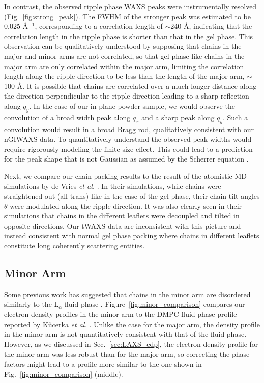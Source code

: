 In contrast, the observed ripple phase WAXS 
peaks were instrumentally 
resolved (Fig.~\ref{fig:strong_peak}). 
The FWHM of the stronger peak was estimated to be 0.025 \AA$^{-1}$,
corresponding to a correlation length of $\sim$240 \AA,
indicating that the correlation length in the ripple phase is shorter 
than that in the gel phase.
This observation can be qualitatively understood by supposing that chains in the major
and minor arms are not correlated, so that gel phase-like chains in the 
major arm are only correlated within the major arm, limiting the correlation
length along the ripple direction to be less than the length of the major 
arm, $\sim$100 \AA. 
It is possible that chains are correlated over a much longer distance 
along the direction perpendicular to the ripple direction leading to
a sharp reflection along $q_y$.
In the case of our in-plane powder sample, we would observe the convolution
of a broad width peak along $q_x$ and a sharp peak along $q_y$. 
Such a convolution would result in a broad Bragg rod,
qualitatively consistent with our nGIWAXS data.
To quantitatively understand the observed peak widths would require rigorously
modeling the finite size effect. This could lead to a prediction
for the peak shape that is not Gaussian as assumed by the Scherrer equation 
\cite{ref:Warren69}.

Next, we compare our chain packing results to the result of the
atomistic MD simulations by de Vries \textit{et al.} \cite{ref:deVries05}.
In their simulations, while chains were straightened out (all-trans) like in 
the case of the gel phase, their chain tilt angles $\theta$ were modulated 
along the ripple direction. It was also
clearly seen in their simulations that chains in the different leaflets were 
decoupled and tilted in opposite directions. Our tWAXS data are 
inconsistent with this picture and instead consistent with normal
gel phase packing where chains in different leaflets constitute long coherently
scattering entities.

\subsection{Minor Arm}
Some previous work has suggested that chains in the minor arm are disordered 
similarly to the L$_\alpha$ fluid phase \cite{ref:Schneider83,ref:Sun96,ref:Pabst04,ref:Riske09}.
Figure~\ref{fig:minor_comparison} compares our electron density profiles
in the minor arm to the DMPC fluid phase profile reported by 
K\v{u}cerka \textit{et al.} \cite{Kucerka05_BPJ}.
Unlike 
the case for the major arm, the density profile in the minor arm
is not quantitatively consistent with that of the fluid phase. 
However, as we discussed in Sec.~\ref{sec:LAXS_edp}, the electron density profile
for the minor arm was less robust than for the major arm,
so correcting the phase factors might lead to a profile more similar 
to the one shown in Fig.~\ref{fig:minor_comparison} (middle).

